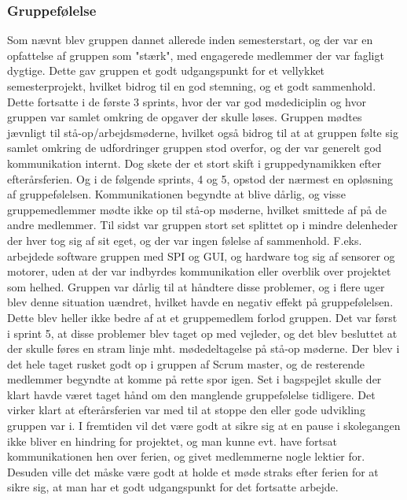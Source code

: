 \subsubsection{Gruppefølelse}
Som nævnt blev gruppen dannet allerede inden semesterstart, og der var en opfattelse af gruppen som "stærk", med engagerede medlemmer der var fagligt dygtige. Dette gav gruppen et godt udgangspunkt for et vellykket semesterprojekt, hvilket bidrog til en god stemning, og et godt sammenhold. Dette fortsatte i de første 3 sprints, hvor der var god mødediciplin og hvor gruppen var samlet omkring de opgaver der skulle løses. Gruppen mødtes jævnligt til stå-op/arbejdsmøderne, hvilket også bidrog til at at gruppen følte sig samlet omkring de udfordringer gruppen stod overfor, og der var generelt god kommunikation internt. Dog skete der et 
stort skift i gruppedynamikken efter efterårsferien. Og i de følgende sprints, 4 og 5, opstod der nærmest en opløsning af gruppefølelsen. Kommunikationen begyndte at blive dårlig, og visse gruppemedlemmer mødte ikke op til stå-op møderne, hvilket smittede af på de andre medlemmer. Til sidst var gruppen stort set splittet op i mindre delenheder der hver tog sig af sit eget, og der var ingen følelse af sammenhold. F.eks. arbejdede software gruppen med SPI og GUI, og hardware tog sig af sensorer og motorer, uden at der var indbyrdes kommunikation eller overblik over projektet som helhed. Gruppen var dårlig til at håndtere disse problemer, og i flere uger blev denne situation uændret, hvilket havde en negativ effekt på gruppefølelsen. Dette blev heller ikke bedre af at et gruppemedlem forlod gruppen. Det var først i sprint 5, at disse problemer blev taget op med vejleder, og det blev besluttet at der skulle føres en stram linje mht. mødedeltagelse på stå-op møderne. Der blev i det hele taget rusket godt op i gruppen af Scrum master, og de resterende medlemmer begyndte at komme på rette spor igen. Set i bagspejlet skulle der klart havde været taget hånd om den manglende gruppefølelse tidligere. Det virker klart at efterårsferien var med til at stoppe den eller gode udvikling gruppen var i. I fremtiden vil det være godt at sikre sig at en pause i skolegangen ikke bliver en hindring for projektet, og man kunne evt. have fortsat kommunikationen hen over ferien, og givet medlemmerne nogle lektier for. Desuden ville det måske være godt at holde et møde straks efter ferien for at sikre sig, at man har et godt udgangspunkt for det fortsatte arbejde.  

